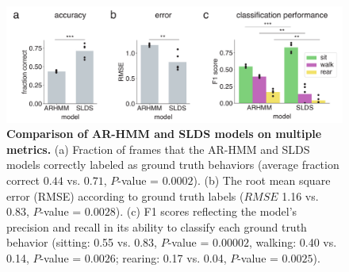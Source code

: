 \begin{figure}[t!]
  \begin{center}
    \includegraphics[width=0.90\linewidth]{ch3-slds/slds-figures/Fig4.pdf}
    \caption[Comparison of AR-HMM and SLDS models on multiple metrics]{\textbf{Comparison of AR-HMM and SLDS models on multiple metrics.} (a) Fraction of frames that the AR-HMM and SLDS models correctly labeled as ground truth behaviors (average fraction correct $0.44$ vs. $0.71$, $P$-value = $0.0002$). (b) The root mean square error (RMSE) according to ground truth labels ($RMSE$ 1.16 vs. 0.83, $P$-value = $0.0028$). (c) F1 scores reflecting the model's precision and recall in its ability to classify each ground truth behavior (sitting: 0.55 vs. 0.83, $P$-value = $0.00002$, walking: 0.40 vs. 0.14, $P$-value = $0.0026$; rearing: 0.17 vs. 0.04, $P$-value = $0.0025$). }
    \label{fig:slds:4}
  \end{center}
  \vspace{-0.5cm}
\end{figure}